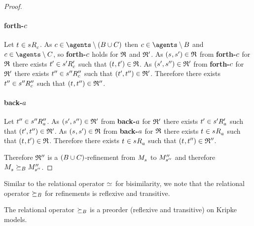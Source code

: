 \begin{proof}
\paragraph{forth-$c$}
Let $\kStateT \in \kSuccessorsC{\kStateS}$.
As $\agentC \in \agents \setminus (\agentsB \cup \agentsC)$ then $\agentC \in \agents \setminus \agentsB$ and $\agentC \in \agents \setminus \agentsC$, so {\bf forth-$c$} holds for $\mathfrak{R}$ and $\mathfrak{R}'$.
As $(\kStateS, \kStateSP) \in \refinement$ from {\bf forth-$c$} for $\mathfrak{R}$ there exists ${t}^{\prime} \in {{s}^{\prime}} {R^{\prime}_{c}}$ such that $(\kStateT, \kStateTP) \in \refinement$.
As $({s}^{\prime}, {s}^{\prime\prime}) \in \mathfrak{R}'$ from {\bf forth-$c$} for $\mathfrak{R}'$ there exists ${t}^{\prime\prime} \in {{s}^{\prime\prime}} {R^{\prime\prime}_{c}}$ such that $({t}^{\prime}, {t}^{\prime\prime}) \in \mathfrak{R}'$.
Therefore there exists ${t}^{\prime\prime} \in {{s}^{\prime\prime}} {R^{\prime\prime}_{c}}$ such that $(\kStateT, \kStateTPP) \in \refinement''$.

\paragraph{back-$a$}
Let ${t}^{\prime\prime} \in {{s}^{\prime\prime}} {R^{\prime\prime}_{a}}$.
As $({s}^{\prime}, {s}^{\prime\prime}) \in \mathfrak{R}'$ from {\bf back-$a$} for $\mathfrak{R}'$ there exists ${t}^{\prime} \in {{s}^{\prime}} {R^{\prime}_{a}}$ such that $({t}^{\prime}, {t}^{\prime\prime}) \in \mathfrak{R}'$.
As $(\kStateS, \kStateSP) \in \refinement$ from {\bf back-$a$} for $\mathfrak{R}$ there exists $\kStateT \in \kSuccessorsA{\kStateS}$ such that $(\kStateT, \kStateTP) \in \refinement$.
Therefore there exists $\kStateT \in \kSuccessorsA{\kStateS}$ such that $(\kStateT, \kStateTPP) \in \refinement''$.

Therefore $\mathfrak{R}''$ is a $(B \cup C)$-refinement from $\kPModel{\kStateS}$ to ${M^{\prime\prime}_{{s}^{\prime\prime}}}$ and therefore $\kPModel{\kStateS} \simulatesBs \kPModelPP{\kStateSPP}$.
\end{proof}

Similar to the relational operator $\bisimilar$ for bisimilarity, we note that the relational operator $\succeq_{B}$ for refinements is reflexive and transitive.

\begin{proposition}\label{refinements-preorder}
The relational operator $\succeq_{B}$ is a preorder (reflexive and transitive) on Kripke models.
\end{proposition}

